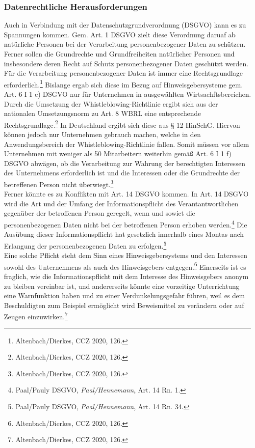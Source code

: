 \subsubsection{Datenrechtliche Herausforderungen}
Auch in Verbindung mit der Datenschutzgrundverordnung (DSGVO) kann es zu Spannungen kommen.
Gem. Art. 1 DSGVO zielt diese Verordnung daruaf ab natürliche Personen bei der Verarbeitung personenbezogener Daten zu schützen.
Ferner sollen die Grundrechte und Grundfreiheiten natürlicher Personen und insbesondere deren Recht auf Schutz personenbezogener Daten geschützt werden.
Für die Verarbeitung personenbezogener Daten ist immer eine Rechtsgrundlage erforderlich.\footnote{Altenbach/Dierkes, CCZ 2020, 126.}
Bislange ergab sich diese im Bezug auf Hinweisgebersysteme gem. Art. 6 I 1 c) DSGVO nur für Unternehmen in ausgewählten Wirtsachftsbereichen.
Durch die Umsetzung der Whistleblowing-Richtlinie ergibt sich aus der nationalen Umsetzungsnorm zu Art. 8 WBRL eine entsprechende Rechtsgrundlage.\footnote{Altenbach/Dierkes, CCZ 2020, 126.}
In Deutschland ergibt sich diese aus § 12 HinSchG.
Hiervon können jedoch nur Unternehmen gebrauch machen, welche in den Anwendungsbereich der Whistleblowing-Richtlinie fallen.
Somit müssen vor allem Unternehmen mit weniger als 50 Mitarbeitern weiterhin gemäß Art. 6 I 1 f) DSGVO abwägen, ob die Verarbeitung zur Wahrung der berechtigten Interessen des Unternehmens erforderlich ist und die Interessen oder die Grundrechte der betreffenen Person nicht überwiegt.\footnote{Altenbach/Dierkes, CCZ 2020, 126.}\\
Ferner könnte es zu Konflikten mit Art. 14 DSGVO kommen.
In Art. 14 DSGVO wird die Art und der Umfang der Informationspflicht des Verantantwortlichen gegenüber der betroffenen Person geregelt, wenn und sowiet die personenbezogenen Daten nicht bei der betroffenen Person erhoben werden.\footnote{Paal/Pauly DSGVO, \textit{Paal/Hennemann}, Art. 14 Rn. 1.}
Die Ausübung dieser Informationspflicht hat gesetzlich innerhalb eines Montas nach Erlangung der personenbezogenen Daten zu erfolgen.\footnote{Paal/Pauly DSGVO, \textit{Paal/Hennemann}, Art. 14 Rn. 34.}\\
Eine solche Pflicht steht dem Sinn eines Hinweisgebersystems und den Interessen sowohl des Unternehmens als auch des Hinweisgebers entgegen.\footnote{Altenbach/Dierkes, CCZ 2020, 126.}
Einerseits ist es fraglich, wie die Informationspflicht mit dem Interesse des Hinweisgebers anonym zu bleiben vereinbar ist, und andererseits könnte eine vorzeitige Unterrichtung eine Warnfunktion haben und zu einer Verdunkelungsgefahr führen, weil es dem Beschuldigten zum Beispiel ermöglicht wird Beweismittel zu verändern oder auf Zeugen einzuwirken.\footnote{Altenbach/Dierkes, CCZ 2020, 126.}
